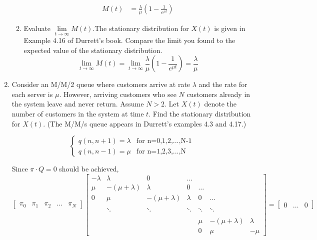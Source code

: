 \documentclass[12pt]{article}
\begin{document}
\begin{enumerate}
\begin{enumerate}[label=(\alph*)]
\begin{align}
        M(t) &= \frac{\lambda}{\mu}\left(1 - \frac{1}{e^{\mu t}}\right) \nonumber
    \end{align}
    \item Evaluate $\lim\limits_{t\to\infty} M(t)$.The stationary distribution for $X(t)$ is given in Example 4.16 of Durrett's book. Compare the limit you found to the expected value of the stationary distribution.
    $$\lim\limits_{t\to\infty}M(t) = \lim\limits_{t\to\infty} \frac{\lambda}{\mu}\left(1 - \frac{1}{e^{\mu t}}\right) = \frac{\lambda}{\mu}$$
\end{enumerate}
    
\newpage
\item Consider an M/M/2 queue where customers arrive at rate $\lambda$ and the rate for each server
is $\mu$. However, arriving customers who see $N$ customers already in the system leave and
never return. Assume $N > 2$. Let $X(t)$ denote the number of customers in the system at
time $t$. Find the stationary distribution for $X(t)$. (The M/M/s queue appears in Durrett's
examples 4.3 and 4.17.)

$$\begin{cases}
q(n,n+1)=\lambda &\text{for n=0,1,2,...,N-1}\\
q(n,n-1)=\mu &\text{for n=1,2,3,...,N}
\end{cases}$$

Since $\pi\cdot Q = 0$ should be achieved,
$$\begin{bmatrix}
\pi_0&\pi_1&\pi_2&\ldots&\pi_N
\end{bmatrix}
\begin{bmatrix}
-\lambda&\lambda&0&\ldots\\
\mu&-(\mu+\lambda)&\lambda&0&\ldots\\
0&\mu&-(\mu+\lambda)&\lambda&0&\ldots\\
\\
&\ddots&\ddots&\ddots&\ddots&\ddots\\
\\
&&&&\mu&-(\mu+\lambda)&\lambda\\
&&&&0&\mu&-\mu
\end{bmatrix}=
\begin{bmatrix}
0&\ldots&0
\end{bmatrix}$$


\end{enumerate}
\end{document}
